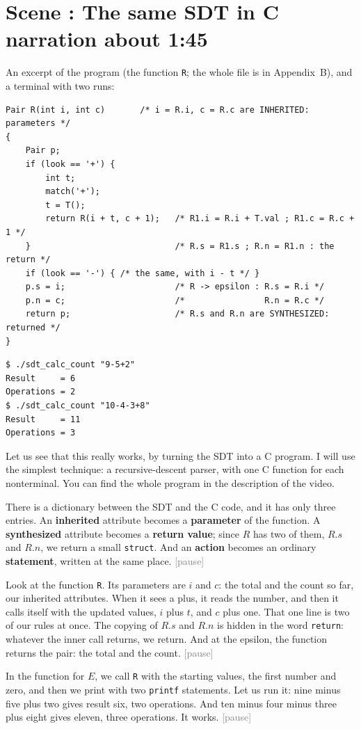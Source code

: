 \documentclass[11pt,a4paper]{article}
\newcommand{\pause}{\textcolor{gray}{\textsf{[pause]}}}
\newcounter{scene}
\newcommand{\scene}[2]{\stepcounter{scene}\needspace{20\baselineskip}\section*{Scene \thescene: #1 \hfill {\normalfont\small #2}}}
\begin{document}
\scene{The same SDT in C}{narration about 1:45}

\begin{onscreen}
An excerpt of the program (the function \texttt{R}; the whole file is in Appendix~B), and a terminal with two runs:
\begin{lstlisting}
Pair R(int i, int c)       /* i = R.i, c = R.c are INHERITED: parameters */
{
    Pair p;
    if (look == '+') {
        int t;
        match('+');
        t = T();
        return R(i + t, c + 1);   /* R1.i = R.i + T.val ; R1.c = R.c + 1 */
    }                             /* R.s = R1.s ; R.n = R1.n : the return */
    if (look == '-') { /* the same, with i - t */ }
    p.s = i;                      /* R -> epsilon : R.s = R.i */
    p.n = c;                      /*                R.n = R.c */
    return p;                     /* R.s and R.n are SYNTHESIZED: returned */
}
\end{lstlisting}
\begin{lstlisting}
$ ./sdt_calc_count "9-5+2"
Result     = 6
Operations = 2
$ ./sdt_calc_count "10-4-3+8"
Result     = 11
Operations = 3
\end{lstlisting}
\end{onscreen}

\begin{narration}
Let us see that this really works, by turning the SDT into a C program. I will use the simplest technique: a recursive-descent parser, with one C function for each nonterminal. You can find the whole program in the description of the video.

There is a dictionary between the SDT and the C code, and it has only three entries. An \textbf{inherited} attribute becomes a \textbf{parameter} of the function. A \textbf{synthesized} attribute becomes a \textbf{return value}; since $R$ has two of them, $R.s$ and $R.n$, we return a small \texttt{struct}. And an \textbf{action} becomes an ordinary \textbf{statement}, written at the same place. \pause

Look at the function \texttt{R}. Its parameters are $i$ and $c$: the total and the count so far, our inherited attributes. When it sees a plus, it reads the number, and then it calls itself with the updated values, $i$ plus $t$, and $c$ plus one. That one line is two of our rules at once. The copying of $R.s$ and $R.n$ is hidden in the word \texttt{return}: whatever the inner call returns, we return. And at the epsilon, the function returns the pair: the total and the count. \pause

In the function for $E$, we call \texttt{R} with the starting values, the first number and zero, and then we print with two \texttt{printf} statements. Let us run it: nine minus five plus two gives result six, two operations. And ten minus four minus three plus eight gives eleven, three operations. It works. \pause
\end{narration}
\end{document}
